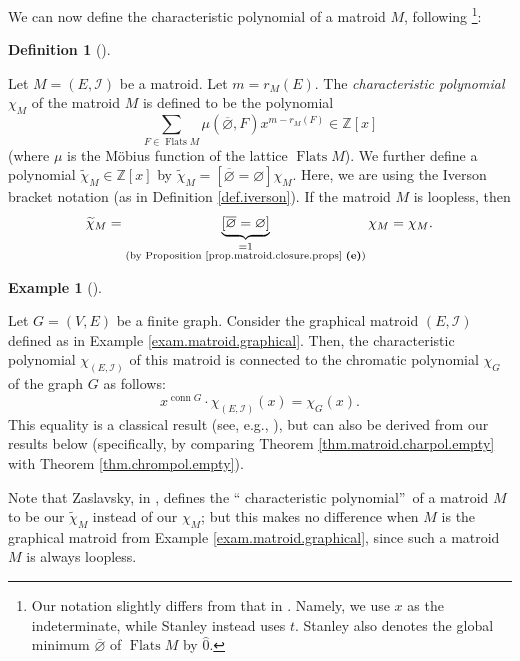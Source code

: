 \documentclass[numbers=enddot,12pt,final,onecolumn,notitlepage]{scrartcl}%
\theoremstyle{definition}
\newtheorem{defi}[theo]{Definition}
\newenvironment{definition}[1][]
{\begin{defi}[#1]\begin{leftbar}}
{\end{leftbar}\end{defi}}
\newtheorem{exmp}[theo]{Example}
\newenvironment{example}[1][]
{\begin{exmp}[#1]\begin{leftbar}}
{\end{leftbar}\end{exmp}}
\let\sumnonlimits\sum
\renewcommand{\sum}{\sumnonlimits\limits}
\begin{document}
We can now define the characteristic polynomial of a matroid $M$, following
\cite[(22)]{Stanley}\footnote{Our notation slightly differs from that in
\cite[(22)]{Stanley}. Namely, we use $x$ as the indeterminate, while Stanley
instead uses $t$. Stanley also denotes the global minimum $\overline
{\varnothing}$ of $\operatorname*{Flats}M$ by $\widehat{0}$.}:

\begin{definition}
\label{def.matroid.charpol}Let $M=\left(  E,\mathcal{I}\right)  $ be a
matroid. Let $m=r_{M}\left(  E\right)  $. The \emph{characteristic polynomial}
$\chi_{M}$ of the matroid $M$ is defined to be the polynomial%
\[
\sum_{F\in\operatorname*{Flats}M}\mu\left(  \overline{\varnothing},F\right)
x^{m-r_{M}\left(  F\right)  }\in\mathbb{Z}\left[  x\right]
\]
(where $\mu$ is the M\"{o}bius function of the lattice $\operatorname*{Flats}%
M$). We further define a polynomial $\widetilde{\chi}_{M}\in\mathbb{Z}\left[
x\right]  $ by $\widetilde{\chi}_{M}=\left[  \overline{\varnothing
}=\varnothing\right]  \chi_{M}$. Here, we are using the Iverson bracket
notation (as in Definition \ref{def.iverson}). If the matroid $M$ is loopless,
then%
\[
\widetilde{\chi}_{M}=\underbrace{\left[  \overline{\varnothing}=\varnothing
\right]  }_{\substack{=1\\\text{(by Proposition
\ref{prop.matroid.closure.props} \textbf{(e)})}}}\chi_{M}=\chi_{M}.
\]

\end{definition}

\begin{example}
\label{exam.matroid.charpol.graph}Let $G=\left(  V,E\right)  $ be a finite
graph. Consider the graphical matroid $\left(  E,\mathcal{I}\right)  $ defined
as in Example \ref{exam.matroid.graphical}. Then, the characteristic
polynomial $\chi_{\left(  E,\mathcal{I}\right)  }$ of this matroid is
connected to the chromatic polynomial $\chi_{G}$ of the graph $G$ as follows:%
\[
x^{\operatorname*{conn}G}\cdot\chi_{\left(  E,\mathcal{I}\right)  }\left(
x\right)  =\chi_{G}\left(  x\right)  .
\]
This equality is a classical result (see, e.g., \cite[Proposition
7.5.1]{Zaslav87}), but can also be derived from our results below
(specifically, by comparing Theorem \ref{thm.matroid.charpol.empty} with
Theorem \ref{thm.chrompol.empty}).
\end{example}

Note that Zaslavsky, in \cite[\S 7.2]{Zaslav87}, defines the \textquotedblleft
characteristic polynomial\textquotedblright\ of a matroid $M$ to be our
$\widetilde{\chi}_{M}$ instead of our $\chi_{M}$; but this makes no difference
when $M$ is the graphical matroid from Example \ref{exam.matroid.graphical},
since such a matroid $M$ is always loopless.
\end{document}
